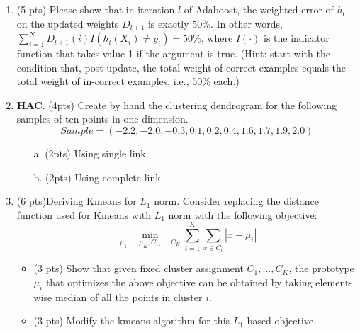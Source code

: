 \documentclass{article}
\begin{document}
\begin{enumerate}
{Observe that all of the leaf nodes are either pure or empty. This means that $H(Y|A,B,C) = 0$.
}

\item (5 pts) Please show that in iteration $l$ of Adaboost, the weighted error of $h_l$ on the updated weights $D_{l+1}$ is exactly 50\%. In other words, $\sum_{i=1}^N D_{l+1}(i) I(h_l(X_i)\neq y_i) = 50\%$, where $I(\cdot)$ is the indicator function that takes value 1 if the argument is true. (Hint: start with the condition that, post update, the total weight of correct examples equals the total weight of in-correct examples, i.e., 50\% each.)


\item {\bf HAC}. (4pts) Create by hand the clustering dendrogram for the following samples of ten points in one dimension.
\[Sample=( - 2.2, -2.0, -0.3, 0.1, 0.2, 0.4, 1.6, 1.7, 1.9, 2.0)\]
\begin{itemize}
\item[a.] (2pts) Using single link.\\

\item[b.] (2pts) Using complete link \\

\end{itemize}


\item (6 pts)Deriving Kmeans for $L_1$ norm. 
Consider replacing the distance function used for Kmeans with $L_1$ norm with the following objective:
\[\min_{\mu_1,...,\mu_K,C_1,...,C_K}\sum_{i=1}^K \sum_{x\in C_i} |x-\mu_i|\]

\begin{itemize}
    \item (3 pts) Show that given fixed cluster assignment $C_1, ..., C_K$, the prototype $\mu_i$ that optimizes the above objective can be obtained by taking element-wise median of all the points in cluster $i$.


\item  (3 pts) Modify the kmeans algorithm for this $L_1$ based objective.\\
\end{itemize}
\end{enumerate}
\end{document}
